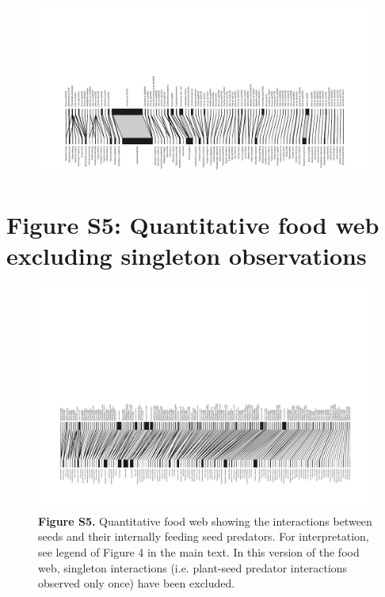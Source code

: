 \documentclass[11pt]{article}
\begin{document}
\begin{figure}[H]

\centering\includegraphics[width=1.2\textwidth, angle = 270, origin=c]{../Figures/FigureS4Lepidoptera.pdf} 

\end{figure}

\newpage


\section{Figure S5: Quantitative food web excluding singleton observations}


\begin{figure}[H]
\caption[]{\textbf{Figure S5.} Quantitative food web showing the interactions between seeds and their internally feeding seed predators. For interpretation, see legend of Figure 4 in the main text. In this version of the food web, singleton interactions (i.e. plant-seed predator interactions observed only once) have been excluded. }
\centering\includegraphics[width=1.2\textwidth, angle = 270, origin=c]{../Figures/FigureS5.pdf} 
\end{figure}
\end{document}
